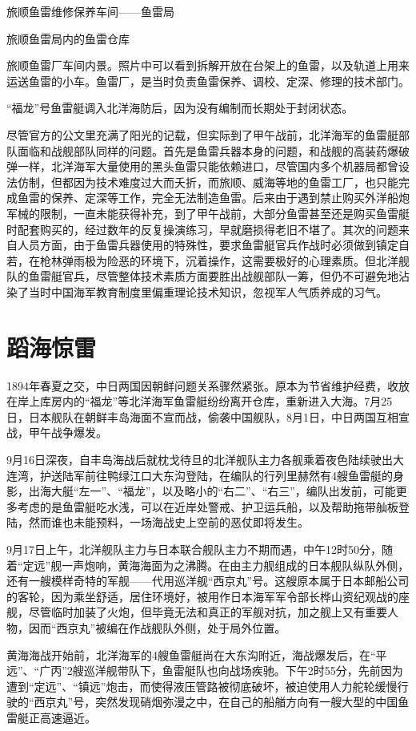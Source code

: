 \documentclass[12pt,UTF8]{ctexbook}
\begin{document}
旅顺鱼雷维修保养车间——鱼雷局

旅顺鱼雷局内的鱼雷仓库

旅顺鱼雷厂车间内景。照片中可以看到拆解开放在台架上的鱼雷，以及轨道上用来运送鱼雷的小车。鱼雷厂，是当时负责鱼雷保养、调校、定深、修理的技术部门。

“福龙”号鱼雷艇调入北洋海防后，因为没有编制而长期处于封闭状态。

尽管官方的公文里充满了阳光的记载，但实际到了甲午战前，北洋海军的鱼雷艇部队面临和战舰部队同样的问题。首先是鱼雷兵器本身的问题，和战舰的高装药爆破弹一样，北洋海军大量使用的黑头鱼雷只能依赖进口，尽管国内多个机器局都曾设法仿制，但都因为技术难度过大而夭折，而旅顺、威海等地的鱼雷工厂，也只能完成鱼雷的保养、定深等工作，完全无法制造鱼雷。后来由于遇到禁止购买外洋船炮军械的限制，一直未能获得补充，到了甲午战前，大部分鱼雷甚至还是购买鱼雷艇时配套购买的，经过数年的反复操演练习，早就磨损得老旧不堪了。其次的问题来自人员方面，由于鱼雷兵器使用的特殊性，要求鱼雷艇官兵作战时必须做到镇定自若，在枪林弹雨极为险恶的环境下，沉着操作，这需要极好的心理素质。但北洋舰队的鱼雷艇官兵，尽管整体技术素质方面要胜出战舰部队一筹，但仍不可避免地沾染了当时中国海军教育制度里偏重理论技术知识，忽视军人气质养成的习气。

\section{蹈海惊雷}

1894年春夏之交，中日两国因朝鲜问题关系骤然紧张。原本为节省维护经费，收放在岸上库房内的“福龙”等北洋海军鱼雷艇纷纷离开仓库，重新进入大海。7月25日，日本舰队在朝鲜丰岛海面不宣而战，偷袭中国舰队，8月1日，中日两国互相宣战，甲午战争爆发。

9月16日深夜，自丰岛海战后就枕戈待旦的北洋舰队主力各舰乘着夜色陆续驶出大连湾，护送陆军前往鸭绿江口大东沟登陆，在编队的行列里赫然有4艘鱼雷艇的身影，出海大艇“左一”、“福龙”，以及略小的“右二”、“右三”，编队出发前，可能更多考虑的是鱼雷艇吃水浅，可以在近岸处警戒、护卫运兵船，以及帮助拖带舢板登陆，然而谁也未能预料，一场海战史上空前的恶仗即将发生。

9月17日上午，北洋舰队主力与日本联合舰队主力不期而遇，中午12时50分，随着“定远”舰一声炮响，黄海海面为之沸腾。在由主力舰组成的日本舰队纵队外侧，还有一艘模样奇特的军舰——代用巡洋舰“西京丸”号。这艘原本属于日本邮船公司的客轮，因为乘坐舒适，居住环境好，被用作日本海军军令部长桦山资纪观战的座舰，尽管临时加装了火炮，但毕竟无法和真正的军舰对抗，加之舰上又有重要人物，因而“西京丸”被编在作战舰队外侧，处于局外位置。

黄海海战开始前，北洋海军的4艘鱼雷艇尚在大东沟附近，海战爆发后，在“平远”、“广丙”2艘巡洋舰带队下，鱼雷艇队也向战场疾驰。下午2时55分，先前因为遭到“定远”、“镇远”炮击，而使得液压管路被彻底破坏，被迫使用人力舵轮缓慢行驶的“西京丸”号，突然发现硝烟弥漫之中，在自己的船艏方向有一艘大型的中国鱼雷艇正高速逼近。
\end{document}

